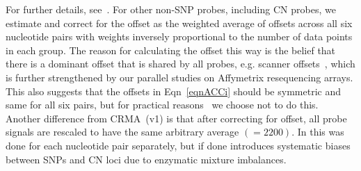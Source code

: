 \documentclass{bioinfo}
\begin{document}
For further details, see~\citet{BengtssonH_etal_2008a}.  For other non-SNP probes, including CN probes, we estimate and correct for the offset as the weighted average of offsets across all six nucleotide pairs with weights inversely proportional to the number of data points in each group.  The reason for calculating the offset this way is the belief that there is a dominant offset that is shared by all probes, e.g. scanner offsets~\citep{BengtssonH_etal_2004}, which is further strengthened by our parallel studies on Affymetrix resequencing arrays.  This also suggests that the offsets in Eqn~\eqref{eqnACCi} should be symmetric and same for all six pairs, but for practical reasons~\citep{BengtssonH_etal_2008a} we choose not to do this.
Another difference from CRMA~(v1) is that after correcting for offset, all probe signals are rescaled to have the same arbitrary average $(=2200)$.  In \citet{BengtssonH_etal_2008a} this was done for each nucleotide pair separately, but if done introduces systematic biases between SNPs and CN loci due to enzymatic mixture imbalances.
\end{document}
